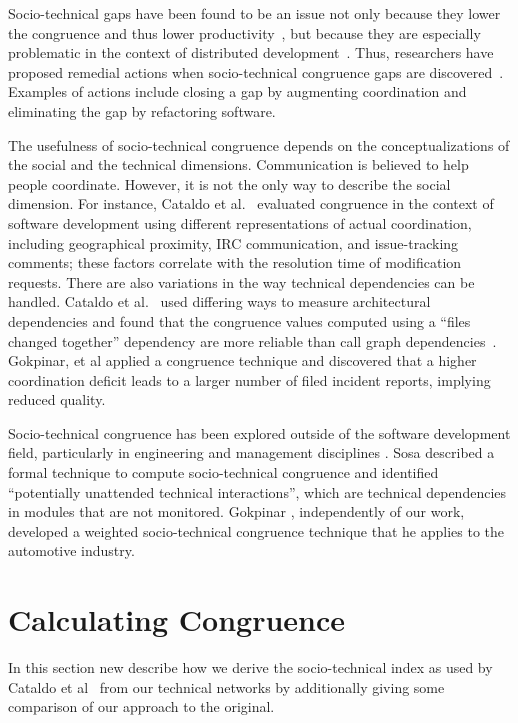 Socio-technical gaps have been found to be an issue not only because they lower
the congruence and thus lower productivity~\cite{cataldo:cscw:2006}, but because they are especially problematic in the context of distributed development~\cite{ehrlich:stc:2008}. Thus, researchers have proposed remedial actions when socio-technical congruence gaps are discovered~\cite{valetto2007:value}. 
Examples of actions include closing a gap by augmenting coordination and eliminating the gap by refactoring software.

The usefulness of socio-technical congruence depends on the conceptualizations of
the social and the technical dimensions. Communication is believed to help people coordinate. However, it is not the only way to describe the social dimension. 
For instance, Cataldo et al.~\cite{cataldo:cscw:2006} evaluated congruence in the context of software development using different representations of actual coordination, including geographical proximity, IRC communication, and issue-tracking comments; these factors correlate with the resolution time of modification requests. There are also variations in the way technical dependencies can be handled. Cataldo et al.~\cite{cataldo:esem:2008} used differing ways to measure architectural dependencies and found that the congruence values computed using a ``files changed together'' dependency are more reliable than call graph dependencies~\cite{deSouza2004:thwarts_collaboration}. Gokpinar, et al \cite{gokpinar2010} applied a congruence technique and discovered that a higher coordination deficit leads to a larger number of filed incident reports, implying reduced quality.

Socio-technical congruence has been explored outside of the software development field, particularly in engineering and management disciplines \cite{henderson1990,sosa2004:manage,gokpinar2010,sosa2008}. Sosa \cite{sosa2008} described a formal technique to compute socio-technical congruence and identified ``potentially unattended technical interactions'', which are technical dependencies in modules that are not monitored. Gokpinar \cite{gokpinar2010}, independently of our work, developed a weighted socio-technical congruence technique that he applies to the automotive industry.




\section{Calculating Congruence}
\label{sec:congruence}
In this section new describe how we derive the socio-technical index as used by Cataldo et al~\cite{cataldo:cscw:2006} from our technical networks by additionally giving some comparison of our approach to the original.

